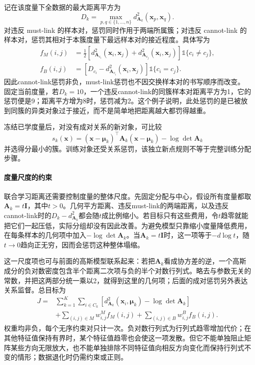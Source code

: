 记在该度量下全数据的最大距离平方为
\[
 D_k=\max_{p,q\in\{1,\ldots,n\}}
 d_{\bm{A}_k}^2(\bm{x}_p,\bm{x}_q).
\]
对违反 must-link 的样本对，惩罚同时作用于两端所属簇；对违反 cannot-link 的样本对，惩罚其相对于本簇度量下最远样本对的接近程度。具体写为
\begin{align}
 f_M(i,j)
 &=\frac12\left[
 d_{\bm{A}_{c_i}}^2(\bm{x}_i,\bm{x}_j)
 +d_{\bm{A}_{c_j}}^2(\bm{x}_i,\bm{x}_j)\right]
 \mathbb{1}\{c_i\ne c_j\},\nonumber\\
 f_B(i,j)
 &=\left[D_{c_i}
 -d_{\bm{A}_{c_i}}^2(\bm{x}_i,\bm{x}_j)\right]
 \mathbb{1}\{c_i=c_j\}.
 \label{eq:clustering-mpck-penalty}
\end{align}
因此cannot-link惩罚非负，must-link惩罚也不因交换样本对的书写顺序而改变。固定当前度量，若$D_k=10$，一个违反cannot-link的同簇样本对距离平方为1，它的惩罚便是9；距离平方增为8时，惩罚减为2。这个例子说明，此处惩罚的是已被放到同簇的异类对象过于接近，而不是简单地把距离越大都罚得越重。

冻结已学度量后，对没有成对关系的新对象，可比较
\[
 s_k(\bm x)=(\bm x-\bm\mu_k)^\top\bm A_k(\bm x-\bm\mu_k)
                -\log\det\bm A_k
\]
并选得分最小的簇。训练对象还受关系惩罚，该独立新点规则不等于完整训练分配步骤。

\paragraph{度量尺度的约束}

联合学习距离还需要控制度量的整体尺度。先固定分配与中心，假设所有度量都取$\bm A_k=t\bm I$，其中$t>0$。几何平方距离、违反must-link的两端距离，以及违反cannot-link时的$D_k-d_{\bm A_k}^2$都会随$t$成比例缩小。若目标只有这些费用，令$t$趋零就能把它们一起压低，实际分组却没有因此改善。为避免模型只靠缩小度量降低费用，在每条样本的几何项中加入$-\log\det\bm A_k$。当$\bm A_k=t\bm I$时，这一项等于$-d\log t$，随$t\to0$趋向正无穷，因而会惩罚这种整体塌缩。

这一尺度项也可与前面的高斯模型联系起来：若把$\bm A_k$看成协方差的逆，一个高斯成分的负对数密度包含半个距离二次项与负的半个对数行列式。略去与参数无关的常数，并把这两部分统一乘以2，就得到这里的几何项；后面的成对惩罚另外表达关系监督。总目标为
\begin{equation}
 \begin{aligned}
 J={}&\sum_{k=1}^K\sum_{i\in C_k}
 \left[d_{\bm{A}_k}^2(\bm{x}_i,\bm{\mu}_k)
       -\log\det\bm{A}_k\right]\\
 &+\sum_{(i,j)\in M}w_{i,j}^{M}f_M(i,j)
  +\sum_{(i,j)\in B}w_{i,j}^{B}f_B(i,j).
 \end{aligned}
 \label{eq:clustering-mpck}
\end{equation}
权重均非负，每个无序约束对只计一次。负对数行列式为行列式趋零增加代价；在其他特征值保持有界时，某个特征值趋零也会使这一项发散。但它不能单独阻止矩阵某些方向无限放大，也不能单独排除不同特征值向相反方向变化而保持行列式不变的情形；数据退化时仍需约束或正则。


